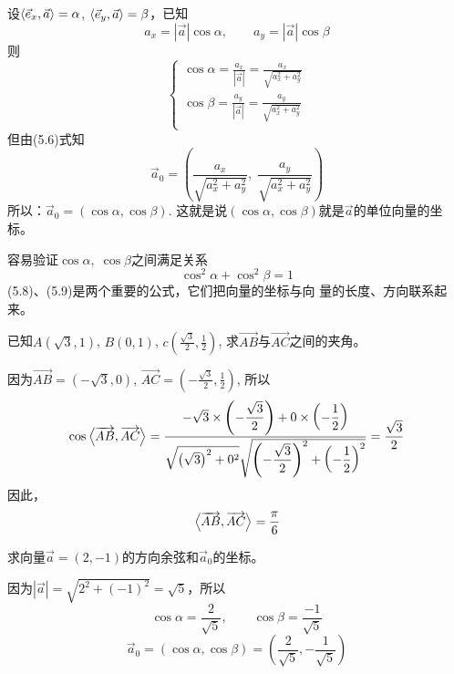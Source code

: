 设$\left\langle \vec{e}_x,\vec{a} \right\rangle=\alpha$, $\left\langle \vec{e}_y,\vec{a} \right\rangle=\beta$，已知
\[a_x=|\vec{a}|\cos\alpha,\qquad a_y=|\vec{a}|\cos\beta\]
则
\begin{equation}
    \begin{cases}
\cos\alpha=\frac{a_x}{|\vec{a}|}=\frac{a_x}{\sqrt{a_x^2+a_y^2}}\\
\cos\beta=\frac{a_y}{|\vec{a}|}=\frac{a_y}{\sqrt{a_x^2+a_y^2}}\\
    \end{cases}
\end{equation}
但由(5.6)式知
\[\vec{a}_0=\left(\frac{a_x}{\sqrt{a_x^2+a_y^2}},\; \frac{a_y}{\sqrt{a_x^2+a_y^2}}\right)\]
所以：$\vec{a}_0=(\cos\alpha,\cos\beta)$. 这就是说$(\cos\alpha,\cos\beta)$就是$\vec{a}$的单位向量的坐标。

容易验证$\cos\alpha,\; \cos\beta$之间满足关系
\begin{equation}
    \cos^2\alpha+\cos^2\beta=1
\end{equation}
(5.8)、(5.9)是两个重要的公式，它们把向量的坐标与向
量的长度、方向联系起来。

\begin{example}
  已知$A(\sqrt{3},1)$, $B(0,1)$, 
$c\left(\frac{\sqrt{3}}{2},\frac{1}{2}\right)$, 
求$\Vec{AB}$与$\Vec{AC}$之间的夹角。  
\end{example}

\begin{solution}
因为$\Vec{AB}=(-\sqrt{3},0)$, $\Vec{AC}=\left(-\frac{\sqrt{3}}{2},\frac{1}{2}\right)$, 所以
\[\cos \left\langle \overrightarrow{AB},\overrightarrow{AC} \right\rangle =\dfrac{-\sqrt{3}\times\left(-\dfrac{\sqrt{3}}{2}\right)+0\times \left(-\dfrac{1}{2}\right)}{\sqrt{\left(\sqrt{3}\right)^2+0^2}\sqrt{\left(-\dfrac{\sqrt{3}}{2}\right)^2+\left(-\dfrac{1}{2}\right)^2}}=\dfrac{\sqrt{3}}{2}\]
因此，
\[\left\langle \overrightarrow{AB},\overrightarrow{AC} \right\rangle=\dfrac{\pi}{6}\]
\end{solution}

\begin{example}
    求向量$\vec{a}=(2,-1)$的方向余弦和$\vec{a}_0$的坐标。
\end{example}

\begin{solution}
因为$|\vec{a}|=\sqrt{2^2+(-1)^2}=\sqrt{5}$，所以
\[\cos\alpha=\frac{2}{\sqrt{5}},\qquad \cos\beta=\frac{-1}{\sqrt{5}}\]
\[\vec{a}_0=(\cos\alpha,\cos\beta)=\left(\frac{2}{\sqrt{5}},-\frac{1}{\sqrt{5}}\right)\]
\end{solution}

